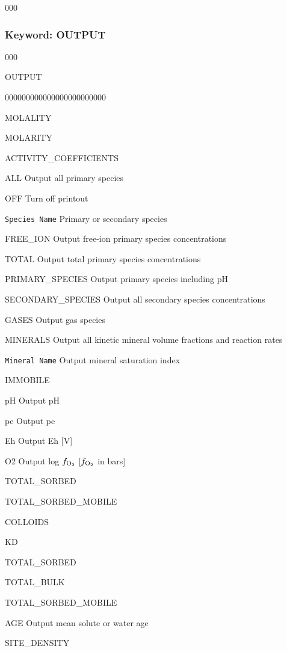 \begin{deflist}{000}
\clearpage
\protect\hypertarget{target_chem_output}{}
\subsubsection{Keyword: OUTPUT}

\hfill\hyperlink{target_key}{\return}

\begin{deflist}{000}
\item [OUTPUT] ~

\begin{deflist}{000000000000000000000000}
\item[MOLALITY]
\item[MOLARITY]
\item[ACTIVITY\_COEFFICIENTS]
\item[ALL] Output all primary species
\item[OFF] Turn off printout
\item[\tt Species Name] Primary or secondary species
\item[FREE\_ION] Output free-ion primary species concentrations
\item[TOTAL] Output total primary species concentrations
\item[PRIMARY\_SPECIES] Output primary species including pH
\item[SECONDARY\_SPECIES] Output all secondary species concentrations
\item[GASES] Output gas species
\item[MINERALS] Output all kinetic mineral volume fractions and reaction rates
\item[\tt Mineral Name] Output mineral saturation index
\item[IMMOBILE]
\item[pH] Output pH
\item[pe] Output pe
\item[Eh] Output Eh [V]
\item[O2] Output log $f_{\rm O_2}$ [$f_{\rm O_2}$ in bars]
\item[TOTAL\_SORBED]
\item[TOTAL\_SORBED\_MOBILE]
\item[COLLOIDS]
\item[KD]
\item[TOTAL\_SORBED]
\item[TOTAL\_BULK]
\item[TOTAL\_SORBED\_MOBILE]
\item[AGE] Output mean solute or water age
\item[SITE\_DENSITY]
\end{deflist}

\item [\keyend] ~
\end{deflist}

\item [\keyend]
\end{deflist}

